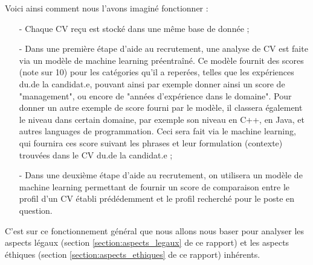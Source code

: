 Voici ainsi comment nous l'avons imaginé fonctionner : 

\begin{enumerate}
    \item[-] Chaque CV reçu est stocké dans une même base de donnée ;
    \item[-] Dans une première étape d'aide au recrutement, une analyse de CV est faite via un modèle de machine learning préentraîné. Ce modèle fournit des scores (note sur 10) pour les catégories qu'il a reperées, telles que les expériences du.de la candidat.e, pouvant ainsi par exemple donner ainsi un score de "management", ou encore de "années d'expérience dans le domaine". Pour donner un autre exemple de score fourni par le modèle, il classera également le niveau dans certain domaine, par exemple son niveau en C++, en Java, et autres languages de programmation. Ceci sera fait via le machine learning, qui fournira ces score suivant les phrases et leur formulation (contexte) trouvées dans le CV du.de la candidat.e ;
    \item[-] Dans une deuxième étape d'aide au recrutement, on utilisera un modèle de machine learning permettant de fournir un score de comparaison entre le profil d'un CV établi prédédemment et le profil recherché pour le poste en question.
\end{enumerate}

C'est sur ce fonctionnement général que nous allons nous baser pour analyser les aspects légaux (section \ref{section:aspects_legaux} de ce rapport) et les aspects éthiques (section \ref{section:aspects_ethiques} de ce rapport) inhérents.

